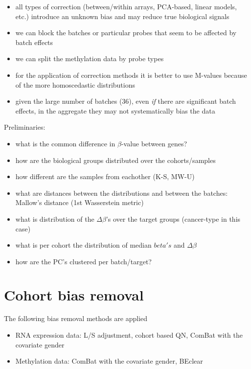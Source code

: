 \documentclass[a4paper,10pt]{article}
\begin{document}
\begin{itemize}
 \item all types of correction (between/within arrays, PCA-based, linear models, etc.) introduce an unknown bias and may reduce true biological signals 
 \item we can block the batches or particular probes that seem to be affected by batch effects
 \item we can split the methylation data by probe types
 \item for the application of correction methods it is better to use M-values because of the more homoscedastic distributions
 \item given the large number of batches ($36$), even \textit{if} there are significant batch effects, in the aggregate they may not systematically bias the data
\end{itemize}

%
Preliminaries:
\begin{itemize}
 \item what is the common difference in $\beta$-value between genes?
 \item how are the biological groups distributed over the cohorts/samples
 \item how different are the samples from eachother (K-S, MW-U)
 \item what are distances between the distributions and between the batches: Mallow’s distance (1st Wasserstein metric)
 \item what is distribution of the $\Delta \beta$'s over the target groups (cancer-type in this case)
 \item what is per cohort the distribution of median $beta's$ and $\Delta \beta$
 \item how are the PC's clustered per batch/target?
\end{itemize}
%
\section{Cohort bias removal}
%
The following bias removal methods are applied
%
\begin{itemize}
\item RNA expression data: L/S adjustment, cohort based QN, ComBat with the covariate gender
\item Methylation data: ComBat with the covariate gender, BEclear 
\end{itemize}
\end{document}

